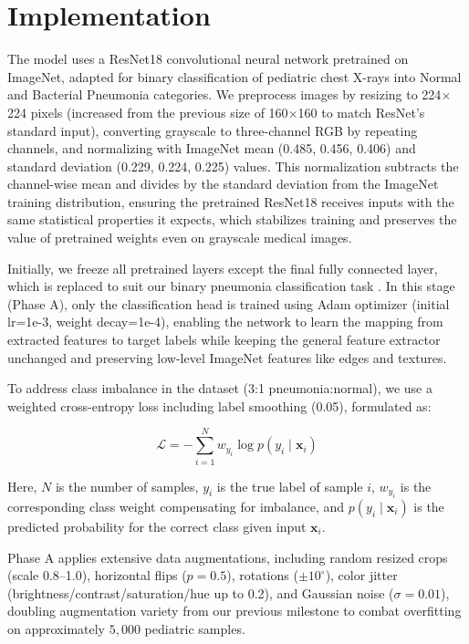 \documentclass[11pt]{article}
\begin{document}
\section{Implementation}



The model uses a ResNet18 convolutional neural network pretrained on ImageNet, adapted for binary classification of pediatric chest X-rays into Normal and Bacterial Pneumonia categories. We preprocess images by resizing to 224$\times$224 pixels (increased from the previous size of 160$\times$160 to match ResNet's standard input), converting grayscale to three-channel RGB by repeating channels, and normalizing with ImageNet mean (0.485, 0.456, 0.406) and standard deviation (0.229, 0.224, 0.225) values. This normalization subtracts the channel-wise mean and divides by the standard deviation from the ImageNet training distribution, ensuring the pretrained ResNet18 receives inputs with the same statistical properties it expects, which stabilizes training and preserves the value of pretrained weights even on grayscale medical images.


Initially, we freeze all pretrained layers except the final fully connected layer, which is replaced to suit our binary pneumonia classification task . In this stage (Phase A), only the classification head is trained using Adam optimizer (initial lr=1e-3, weight decay=1e-4), enabling the network to learn the mapping from extracted features to target labels while keeping the general feature extractor unchanged and preserving low-level ImageNet features like edges and textures.

To address class imbalance in the dataset (3:1 pneumonia:normal), we use a weighted cross-entropy loss including label smoothing (0.05), formulated as:

\begin{equation}
\mathcal{L} = - \sum_{i=1}^N w_{y_i} \log p(y_i \mid \mathbf{x}_i)
\label{eq:weighted_cross_entropy}
\end{equation}

Here, \(N\) is the number of samples, \(y_i\) is the true label of sample \(i\), \(w_{y_i}\) is the corresponding class weight compensating for imbalance, and \(p(y_i \mid \mathbf{x}_i)\) is the predicted probability for the correct class given input \(\mathbf{x}_i\).

Phase A applies extensive data augmentations, including random resized crops (scale 0.8--1.0), 
horizontal flips ($p=0.5$), rotations ($\pm 10^\circ$), color jitter 
(brightness/contrast/saturation/hue up to 0.2), and Gaussian noise ($\sigma=0.01$), 
doubling augmentation variety from our previous milestone to combat overfitting 
on approximately $5{,}000$ pediatric samples. 
\end{document}
